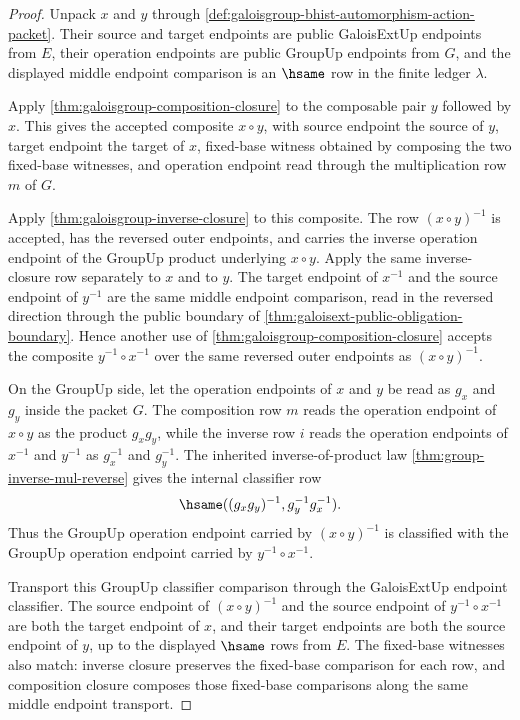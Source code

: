\begin{proof}
Unpack $x$ and $y$ through
\autoref{def:galoisgroup-bhist-automorphism-action-packet}. Their source and
target endpoints are public GaloisExtUp endpoints from $E$, their operation
endpoints are public GroupUp endpoints from $G$, and the displayed middle
endpoint comparison is an $\hsame$ row in the finite ledger $\lambda$.

Apply \autoref{thm:galoisgroup-composition-closure} to the composable pair
$y$ followed by $x$. This gives the accepted composite $x\circ y$, with source
endpoint the source of $y$, target endpoint the target of $x$, fixed-base
witness obtained by composing the two fixed-base witnesses, and operation
endpoint read through the multiplication row $m$ of $G$.

Apply \autoref{thm:galoisgroup-inverse-closure} to this composite. The row
$(x\circ y)^{-1}$ is accepted, has the reversed outer endpoints, and carries
the inverse operation endpoint of the GroupUp product underlying $x\circ y$.
Apply the same inverse-closure row separately to $x$ and to $y$. The target
endpoint of $x^{-1}$ and the source endpoint of $y^{-1}$ are the same middle
endpoint comparison, read in the reversed direction through the public boundary
of \autoref{thm:galoisext-public-obligation-boundary}. Hence another use of
\autoref{thm:galoisgroup-composition-closure} accepts the composite
$y^{-1}\circ x^{-1}$ over the same reversed outer endpoints as
$(x\circ y)^{-1}$.

On the GroupUp side, let the operation endpoints of $x$ and $y$ be read as
$g_x$ and $g_y$ inside the packet $G$. The composition row $m$ reads the
operation endpoint of $x\circ y$ as the product $g_x g_y$, while the inverse
row $i$ reads the operation endpoints of $x^{-1}$ and $y^{-1}$ as $g_x^{-1}$
and $g_y^{-1}$. The inherited inverse-of-product law
\autoref{thm:group-inverse-mul-reverse} gives the internal classifier row
$$
\hsame((g_x g_y)^{-1},g_y^{-1}g_x^{-1}).
$$
Thus the GroupUp operation endpoint carried by $(x\circ y)^{-1}$ is classified
with the GroupUp operation endpoint carried by $y^{-1}\circ x^{-1}$.

Transport this GroupUp classifier comparison through the GaloisExtUp endpoint
classifier. The source endpoint of $(x\circ y)^{-1}$ and the source endpoint of
$y^{-1}\circ x^{-1}$ are both the target endpoint of $x$, and their target
endpoints are both the source endpoint of $y$, up to the displayed $\hsame$
rows from $E$. The fixed-base witnesses also match: inverse closure preserves
the fixed-base comparison for each row, and composition closure composes those
fixed-base comparisons along the same middle endpoint transport.


\end{proof}
